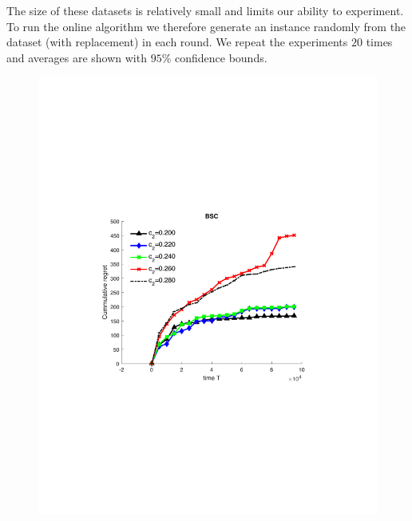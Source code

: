 The size of these datasets is relatively small and limits our ability to experiment. To run the online algorithm we therefore generate an instance randomly from the dataset (with replacement) in each round. We repeat the experiments $20$ times and averages are shown with $95\%$ confidence bounds.

\begin{center}
\begin{figure}[!bt]
\begin{minipage}{8cm}
		\centering
		\includegraphics[scale=0.4]{../Simulations/Figures/BSC_SD}

\end{minipage}
\end{figure}
\end{center}
